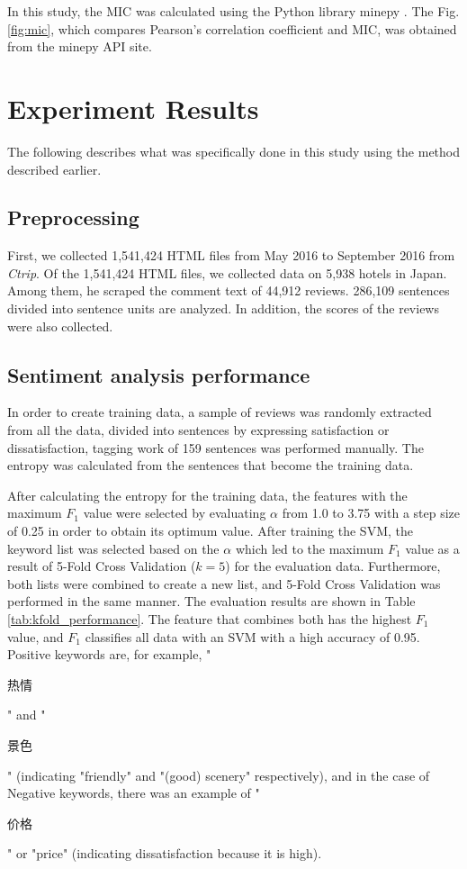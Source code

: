 \documentclass[review]{elsarticle}
\begin{document}
In this study, the MIC was calculated using the Python library minepy \cite[][]{Albanese2012}. The Fig. \ref{fig:mic}, which compares Pearson's correlation coefficient and MIC, was obtained from the minepy API site.

\section{Experiment Results}\label{results}

The following describes what was specifically done in this study using the method described earlier.

\subsection{Preprocessing}\label{res_preprocessing}

First, we collected 1,541,424 HTML files from May 2016 to September 2016 from \textit{Ctrip}. Of the 1,541,424 HTML files, we collected data on 5,938 hotels in Japan. Among them, he scraped the comment text of 44,912 reviews. 286,109 sentences divided into sentence units are analyzed. In addition, the scores of the reviews were also collected.

\subsection{Sentiment analysis performance}\label{res_sentiment_analysis}

In order to create training data, a sample of reviews was randomly extracted from all the data, divided into sentences by expressing satisfaction or dissatisfaction, tagging work of 159 sentences was performed manually. The entropy was calculated from the sentences that become the training data.

After calculating the entropy for the training data, the features with the maximum \(F_1\) value were selected by evaluating \(\alpha\) from 1.0 to 3.75 with a step size of 0.25 in order to obtain its optimum value. After training the SVM, the keyword list was selected based on the \(\alpha\) which led to the maximum \(F_1\) value as a result of 5-Fold Cross Validation (\(k = 5\)) for the evaluation data. Furthermore, both lists were combined to create a new list, and 5-Fold Cross Validation was performed in the same manner. The evaluation results are shown in Table \ref{tab:kfold_performance}. The feature that combines both has the highest \(F_1\) value, and \(F_1\) classifies all data with an SVM with a high accuracy of 0.95. Positive keywords are, for example, "\begin{CJK}{UTF8}{min}热情\end{CJK}" and "\begin{CJK}{UTF8}{min}景色\end{CJK}" (indicating "friendly" and "(good) scenery" respectively), and in the case of Negative keywords, there was an example of "\begin{CJK}{UTF8}{min}价格\end{CJK}" or "price" (indicating dissatisfaction because it is high).
\end{document}
